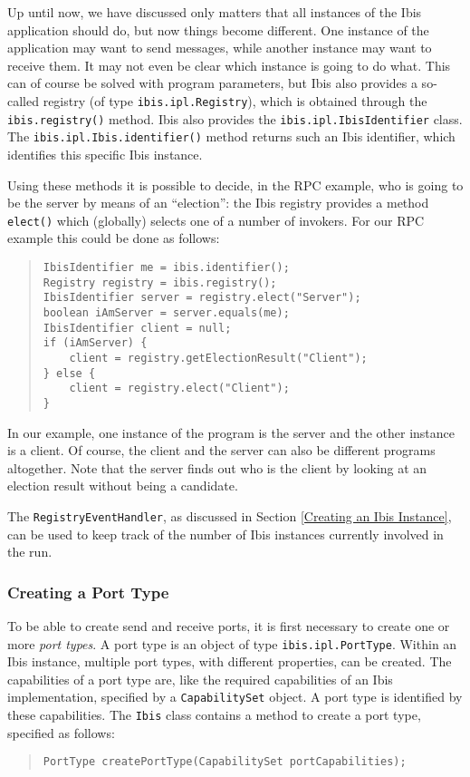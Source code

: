 \documentclass[10pt]{article}
\begin{document}
Up until now, we have discussed only matters that all instances of
the Ibis application should do, but now things become different.
One instance of the application may want to send messages, while
another instance may want to receive them.
It may not even be clear which instance is going to do what.
This can of course be solved with program parameters, but Ibis
also provides a so-called registry (of type
\texttt{ibis.ipl.Registry}), which is obtained through the
\texttt{ibis.registry()} method.
Ibis also provides the \texttt{ibis.ipl.IbisIdentifier} class.
The \texttt{ibis.ipl.Ibis.identifier()} method returns such an
Ibis identifier, which identifies this specific Ibis instance.

Using these methods it is possible to decide, in the RPC example,
who is going to be the server by means of an ``election'': the Ibis
registry provides a method \texttt{elect()} which (globally) selects
one of a number of invokers.  For our RPC example this could be done as
follows:

{\small
\begin{quote}
\begin{verbatim}
IbisIdentifier me = ibis.identifier();
Registry registry = ibis.registry();
IbisIdentifier server = registry.elect("Server");
boolean iAmServer = server.equals(me);
IbisIdentifier client = null;
if (iAmServer) {
    client = registry.getElectionResult("Client");
} else {
    client = registry.elect("Client");
}
\end{verbatim}
\end{quote}
}

In our example, one instance of the program is the server and the
other instance is a client.  Of course, the client and the server can also
be different programs altogether.
Note that the server finds out who is the client by looking at an election
result without being a candidate.

The \texttt{RegistryEventHandler}, as discussed in Section
\ref{Creating an Ibis Instance}, can be used to keep track of the number
of Ibis instances currently involved in the run.

\subsubsection{Creating a Port Type}

To be able to create send and receive ports, it is first necessary
to create one or more \emph{port types}.
A port type is an object
of type \texttt{ibis.ipl.PortType}.
Within an Ibis instance,
multiple port types, with different properties, can be created.
The capabilities of a port type are, like the required capabilities
of an Ibis implementation, specified by a \texttt{CapabilitySet} object.
A port type is identified by these capabilities.
The \texttt{Ibis} class contains a method to create a port type,
specified as follows:
{\small
\begin{quote}
\begin{verbatim}
PortType createPortType(CapabilitySet portCapabilities);
\end{verbatim}
\end{quote}
}
\end{document}
